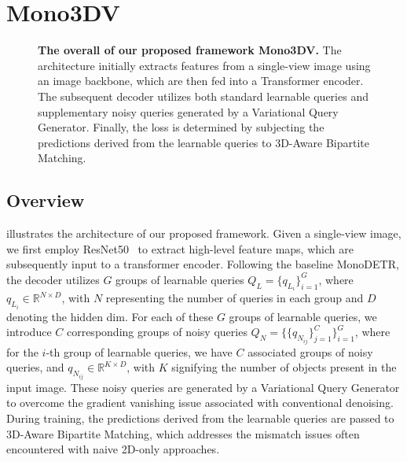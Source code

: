 \section{Mono3DV}
\begin{figure}[h!]
    \centering
    
    \caption{\textbf{The overall of our proposed framework Mono3DV.} The architecture initially extracts features from a single-view image using an image backbone, which are then fed into a Transformer encoder. The subsequent decoder utilizes both standard learnable queries and supplementary noisy queries generated by a Variational Query Generator. Finally, the loss is determined by subjecting the predictions derived from the learnable queries to 3D-Aware Bipartite Matching.}
    \label{fig:mono3dv_overall}
\end{figure}

\subsection{Overview}
\label{mono3dv:overview}
 illustrates the architecture of our proposed framework. Given a single-view image, we first employ ResNet50~\cite{ResNet} to extract high-level feature maps, which are subsequently input to a transformer encoder. Following the baseline MonoDETR\cite{MonoDETR}, the decoder utilizes $G$ groups of learnable queries $Q_L = \{q_{L_i}\}_{i=1}^G$, where $q_{L_i}\in\mathbb{R}^{N \times D}$, with $N$ representing the number of queries in each group and $D$ denoting the hidden dim. For each of these $G$ groups of learnable queries, we introduce $C$ corresponding groups of noisy queries $Q_N = \{\{q_{N_{ij}}\}_{j=1}^C\}_{i=1}^G$, where for the $i$-th group of learnable queries, we have $C$ associated groups of noisy queries, and $q_{N_{ij}}\in\mathbb{R}^{K \times D}$, with $K$ signifying the number of objects present in the input image. These noisy queries are generated by a Variational Query Generator to overcome the gradient vanishing issue associated with conventional denoising. During training, the predictions derived from the learnable queries are passed to 3D-Aware Bipartite Matching, which addresses the mismatch issues often encountered with naive 2D-only approaches.

